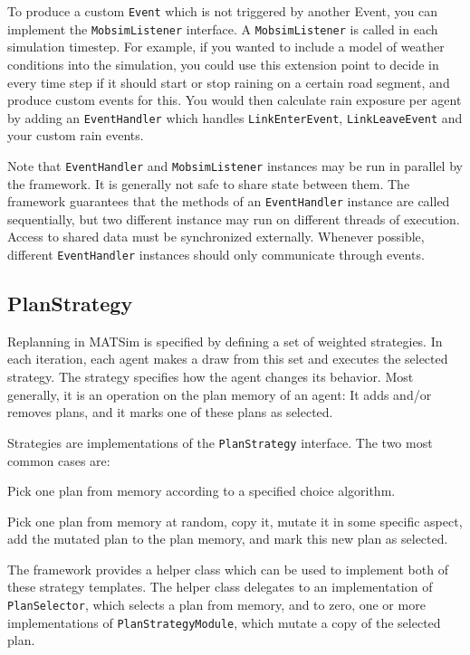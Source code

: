 To produce a custom \lstinline$Event$ which is not triggered by another Event, you can implement the
\lstinline$MobsimListener$ interface. A \lstinline$MobsimListener$ is called in each simulation timestep.
For example, if you wanted to include a model of weather conditions into the simulation, you could use this
extension point to decide in every time step if it should start or stop raining on a certain road segment, 
and produce custom events for this. You would then calculate rain exposure per agent by adding an \lstinline$EventHandler$ which 
handles \lstinline$LinkEnterEvent$, \lstinline$LinkLeaveEvent$ and your custom rain events. 

Note that \lstinline$EventHandler$ and \lstinline$MobsimListener$ instances may be run in parallel by
the framework. It is generally not safe to share state between them. The framework guarantees that 
the methods of an \lstinline$EventHandler$ instance are called sequentially, but two different instance
may run on different threads of execution. Access to shared data must be synchronized externally. Whenever
possible, different \lstinline$EventHandler$ instances should only communicate through events.

\subsection{PlanStrategy}
\label{sec:replanning-extension-point}

Replanning in MATSim is specified by defining a set of weighted strategies. In each
iteration, each agent makes a draw from this set and executes the selected strategy. The
strategy specifies how the agent changes its behavior. Most generally, it is an operation on the plan memory
of an agent: It adds and/or removes plans, and it marks one of these plans as selected.

Strategies are implementations of the \lstinline$PlanStrategy$ interface. 
The two most common cases are:
\begin{compactitem}
\item Pick one plan from memory according to a specified choice algorithm.
\item Pick one plan from memory
at random, copy it, mutate it in some specific aspect, add the mutated plan to the plan memory, and
mark this new plan as selected.
\end{compactitem}

The framework provides a helper class which can be used to implement both of these strategy templates. 
The helper class delegates to an implementation of \lstinline$PlanSelector$, which selects a plan from memory, 
and to zero, one or more implementations of \lstinline$PlanStrategyModule$, which mutate a copy of the selected plan.

